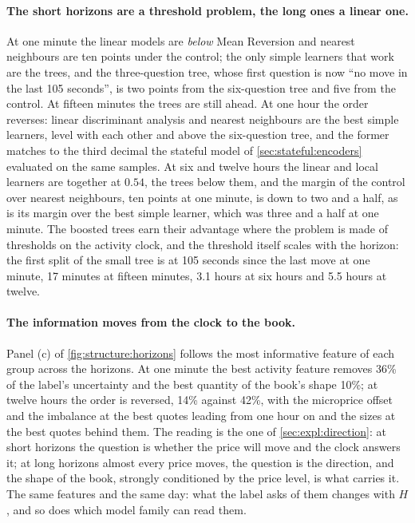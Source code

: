 \paragraph{The short horizons are a threshold problem, the long ones a linear one.}  At
one minute the linear models are \emph{below} Mean Reversion and nearest neighbours are
ten points under the control; the only simple learners that work are the trees, and the
three-question tree, whose first question is now ``no move in the last 105 seconds'', is
two points from the six-question tree and five from the control.  At fifteen minutes the
trees are still ahead.  At one hour the order reverses: linear discriminant analysis and
nearest neighbours are the best simple learners, level with each other and above the
six-question tree, and the former matches to the third decimal the stateful model of \cref{sec:stateful:encoders} evaluated
on the same samples.  At six and twelve hours the linear and local learners are together
at $0.54$, the trees below them, and the margin of the control over nearest neighbours,
ten points at one minute, is down to two and a half, as is its margin over the best simple
learner, which was three and a half at one minute.  The boosted trees earn
their advantage where the problem is made of thresholds on the activity clock, and the
threshold itself scales with the horizon: the first split of the small tree is at 105
seconds since the last move at one minute, 17 minutes at fifteen minutes, 3.1 hours at six
hours and 5.5 hours at twelve.

\paragraph{The information moves from the clock to the book.}  Panel (c) of
\cref{fig:structure:horizons} follows the most informative feature of each group across
the horizons.  At one minute the best activity
feature removes 36\% of the label's uncertainty and the best quantity of the book's shape
10\%; at twelve hours the order is reversed, 14\% against 42\%, with the microprice offset
and the imbalance at the best quotes leading from one hour on and the sizes at the best
quotes behind them.  The reading is the one of \cref{sec:expl:direction}: at short
horizons the question is whether the price will move and the clock answers it; at long
horizons almost every price moves, the question is the direction, and the shape of the
book, strongly conditioned by the price level, is what carries it.  The same features and
the same day: what the label asks of them changes with $H$, and so does which model family
can read them.

